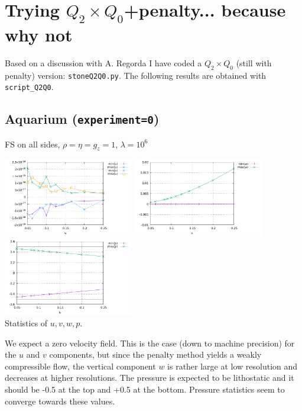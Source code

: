 \newpage
\section*{Trying $Q_2\times Q_0$+penalty... because why not}

Based on a discussion with A. Regorda I have coded a $Q_2\times Q_0$
(still with penalty) version: {\tt stoneQ2Q0.py}.
The following results are obtained with {\tt script\_Q2Q0}.

\subsection*{Aquarium ({\tt experiment=0})}

FS on all sides, $\rho=\eta=g_z=1$, $\lambda=10^6$

\begin{center}
\includegraphics[width=5.7cm]{python_codes/fieldstone_10/resultsQ2/exp0/stats_uv}
\includegraphics[width=5.7cm]{python_codes/fieldstone_10/resultsQ2/exp0/stats_w}
\includegraphics[width=5.7cm]{python_codes/fieldstone_10/resultsQ2/exp0/stats_p}\\
{\captionfont Statistics of $u,v,w,p$.}
\end{center}

We expect a zero velocity field. This is the case (down to machine precision) for the $u$
and $v$ components, but since the penalty method yields a weakly compressible flow, 
the vertical component $w$ is rather large at low resolution and decreases at higher resolutions.
The pressure is expected to be lithostatic and it should be -0.5 at the top and +0.5 at 
the bottom. Pressure statistics seem to converge towards these values. 

